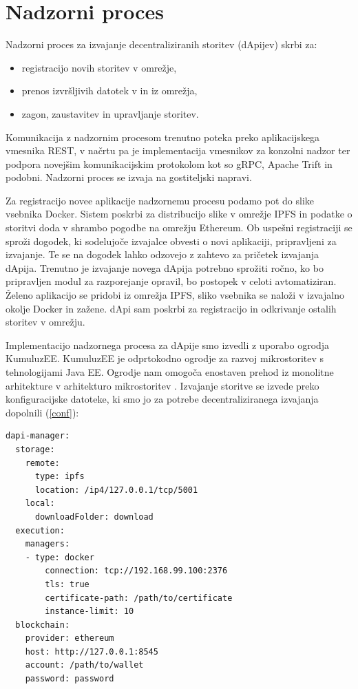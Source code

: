 \documentclass[a4paper, 12pt]{book}
\begin{document}
\section{Nadzorni proces}
Nadzorni proces za izvajanje decentraliziranih storitev (dApijev) skrbi za:
\begin{itemize}
	\item registracijo novih storitev v omrežje, 
	\item prenos izvršljivih datotek v in iz omrežja,
	\item zagon, zaustavitev in upravljanje storitev.
\end{itemize}

Komunikacija z nadzornim procesom trenutno poteka preko aplikacijskega vmesnika REST, v načrtu pa je implementacija vmesnikov za konzolni nadzor ter podpora novejšim komunikacijskim protokolom kot so gRPC, Apache Trift in podobni.
Nadzorni proces se izvaja na gostiteljski napravi.

Za registracijo novee aplikacije nadzornemu procesu podamo pot do slike vsebnika Docker.
Sistem poskrbi za distribucijo slike v omrežje IPFS in podatke o storitvi doda v shrambo pogodbe na omrežju Ethereum.
Ob uspešni registraciji se sproži dogodek, ki sodelujoče izvajalce obvesti o novi aplikaciji, pripravljeni za izvajanje.
Te se na dogodek lahko odzovejo z zahtevo za pričetek izvajanja dApija.
Trenutno je izvajanje novega dApija potrebno sprožiti ročno, ko bo pripravljen modul za razporejanje opravil, bo postopek v celoti avtomatiziran.
Želeno aplikacijo se pridobi iz omrežja IPFS, sliko vsebnika se naloži v izvajalno okolje Docker in zažene.
dApi sam poskrbi za registracijo in odkrivanje ostalih storitev v omrežju.

Implementacijo nadzornega procesa za dApije smo izvedli z uporabo ogrodja KumuluzEE.
KumuluzEE je odprtokodno ogrodje za razvoj mikrostoritev s tehnologijami Java EE.
Ogrodje nam omogoča enostaven prehod iz monolitne arhitekture v arhitekturo mikrostoritev \cite{kumuluzee}.
Izvajanje storitve se izvede preko konfiguracijske datoteke, ki smo jo za potrebe decentraliziranega izvajanja dopolnili (\ref{conf}):

\begin{lstlisting}[caption={Razširitev konfiguracijske datoteke},captionpos=b,label={conf}]
dapi-manager:
  storage:
    remote:
      type: ipfs
      location: /ip4/127.0.0.1/tcp/5001
    local:
      downloadFolder: download
  execution:
  	managers:
  	- type: docker
	    connection: tcp://192.168.99.100:2376
	    tls: true
	    certificate-path: /path/to/certificate
	    instance-limit: 10
  blockchain:
    provider: ethereum
    host: http://127.0.0.1:8545
    account: /path/to/wallet
    password: password
\end{lstlisting}
\end{document}
